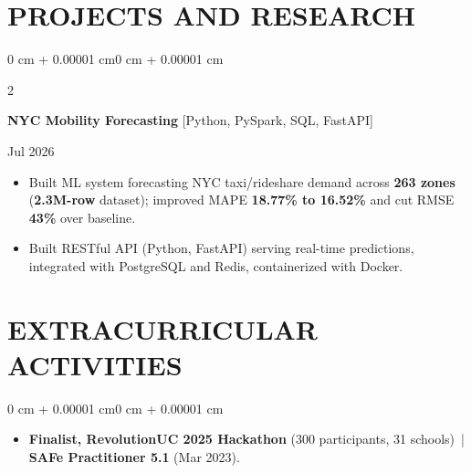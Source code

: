 \documentclass[10pt, letterpaper]{article}
\newenvironment{highlights}{
    \begin{itemize}[
        topsep=0.10 cm,
        parsep=0.06 cm,
        partopsep=0pt,
        itemsep=0.06 cm,
        leftmargin=12pt
    ]
}{
    \end{itemize}
}
\newenvironment{onecolentry}{
    \begin{adjustwidth}{0 cm + 0.00001 cm}{0 cm + 0.00001 cm}
}{
    \end{adjustwidth}
}
\newenvironment{twocolentry}[2][]{
    \onecolentry
    \def\secondColumn{#2}
    \setcolumnwidth{\fill, 4.5 cm}
    \begin{paracol}{2}
}{
    \switchcolumn \raggedleft \secondColumn
    \end{paracol}
    \endonecolentry
}
\begin{document}
\section{PROJECTS AND RESEARCH}
\begin{twocolentry}{Jul 2026}
\textbf{NYC Mobility Forecasting} [Python, PySpark, SQL, FastAPI]
\end{twocolentry}
\begin{highlights}
  \item Built ML system forecasting NYC taxi/rideshare demand across \textbf{263 zones} (\textbf{2.3M-row} dataset); improved MAPE \textbf{18.77\% to 16.52\%} and cut RMSE \textbf{43\%} over baseline.
  \item Built RESTful API (Python, FastAPI) serving real-time predictions, integrated with PostgreSQL and Redis, containerized with Docker.
\end{highlights}

\section{EXTRACURRICULAR ACTIVITIES}
\begin{onecolentry}
\begin{highlights}
  \item \textbf{Finalist, RevolutionUC 2025 Hackathon} (300 participants, 31 schools) \,|\, \textbf{SAFe Practitioner 5.1} (Mar 2023).
\end{highlights}
\end{onecolentry}
\end{document}
